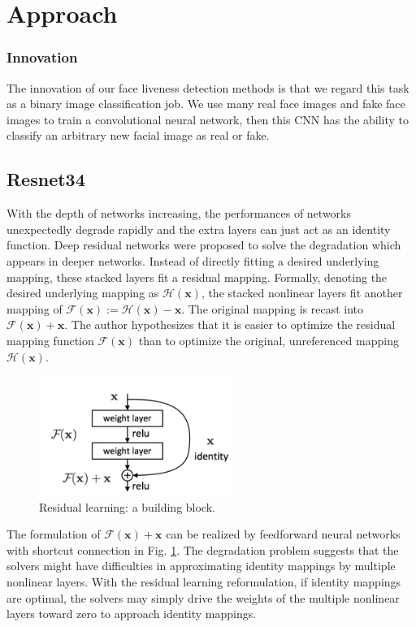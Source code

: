 \documentclass[journal]{IEEEtran}
\begin{document}
\section{Approach}


\subsubsection*{\textbf{Innovation}} The innovation of our face liveness detection methods is that we regard this task as a binary image classification job. We use many real face images and fake face images to train a convolutional neural network, then this CNN has the ability to classify an arbitrary new facial image as real or fake.

\subsection{Resnet34}
 With the depth of networks increasing, the performances of networks unexpectedly degrade rapidly and the extra layers can just act as an identity function. Deep residual networks were proposed to solve the degradation which appears in deeper networks\cite{he2016deep}\cite{he2016identity}. Instead of directly fitting a desired underlying mapping, these stacked layers fit a residual mapping. Formally, denoting the desired underlying mapping as $\mathcal{H}(\mathbf{x})$, the stacked nonlinear layers fit another mapping of $\mathcal{F}(\mathbf{x}) := \mathcal{H}(\mathbf{x})-\mathbf{x}$. The original mapping is recast into $\mathcal{F}(\mathbf{x}) + \mathbf{x}$. The author hypothesizes that it is easier to optimize the residual mapping function $\mathcal{F}(\mathbf{x})$ than to optimize the original, unreferenced mapping $\mathcal{H}(\mathbf{x})$. 

\begin{figure}[!t]
\centering
\includegraphics[width=2.5in]{img/Res_block}
\caption{Residual learning: a building block.}
\label{fig_2_1}
\end{figure}

The formulation of $\mathcal{F}(\mathbf{x})+\mathbf{x}$ can be realized by feedforward neural networks with shortcut connection in Fig. \ref{fig_2_1}. The degradation problem suggests that the solvers might have difficulties in approximating identity mappings by multiple nonlinear layers. With the residual learning reformulation, if identity mappings are optimal, the solvers may simply drive the weights of the multiple nonlinear layers toward zero to approach identity mappings.
\end{document}
